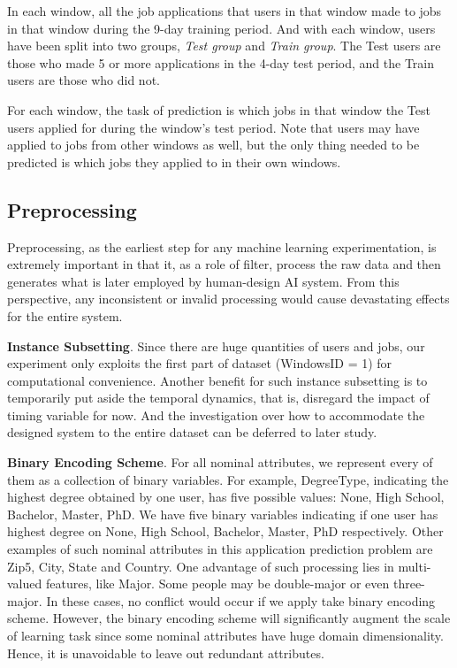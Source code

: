 \documentclass{article} %
\begin{document}
In each window, all the job applications that users in that window made to
jobs in that window during the 9-day training period. 
And with each window, users have been split into two groups, {\it Test group}
and {\it Train group}. The Test users are those who made 5 or more
applications in the 4-day test period, and the Train users are those who did
not.

For each window, the task of prediction is which jobs in that window the Test
users applied for during the window's test period. Note that users may have
applied to jobs from other windows as well, but the only thing needed to be
predicted is which jobs they applied to in their own windows.


\subsection{Preprocessing} %
Preprocessing, as the earliest step for any machine learning
experimentation, is extremely important in that it, as a role of filter, 
process the raw data and then generates what is later employed by human-design
AI system. From this perspective, any inconsistent or invalid processing would
cause devastating effects for the entire system.

{\bf Instance Subsetting}.
Since there are huge quantities of users and jobs, our experiment only
exploits the first part of dataset (WindowsID = 1) for computational
convenience. Another benefit for such instance subsetting is to temporarily
put aside the temporal dynamics, that is, disregard the impact of timing
variable for now. And the investigation over how to accommodate the designed system
to the entire dataset can be deferred to later study.

{\bf Binary Encoding Scheme}.
For all nominal attributes, we represent every of them as a collection of binary
variables. For example, DegreeType, indicating the highest
degree obtained by one user, has five possible values: None, High
School, Bachelor, Master, PhD. We have five binary variables indicating if one
user has highest degree on None, High School, Bachelor, Master, PhD
respectively. Other examples of such nominal attributes in this application
prediction problem are Zip5, City, State and Country. 
One advantage of such processing lies in multi-valued features, like Major.
Some people may be double-major or even three-major. 
In these cases, no conflict would occur if we apply take binary encoding
scheme. However, the binary encoding scheme will significantly augment the scale of
learning task since some nominal attributes have huge domain dimensionality.
Hence, it is unavoidable to leave out redundant attributes. 
\end{document}
